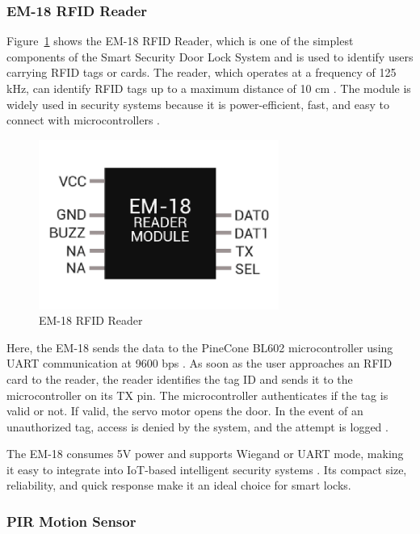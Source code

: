 \documentclass[a4paper]{scrartcl}
\begin{document}
\subsubsection{EM-18 RFID Reader}

Figure~\ref{fig:em18} shows the EM-18 RFID Reader, which is one of the simplest components of the Smart Security Door Lock System and is used to identify users carrying RFID tags or cards. The reader, which operates at a frequency of 125 kHz, can identify RFID tags up to a maximum distance of 10 cm \cite{EM18Datasheet}. The module is widely used in security systems because it is power-efficient, fast, and easy to connect with microcontrollers \cite{RFIDReaderEM18}.

\begin{figure}[H] %
    \centering
    \includegraphics[width=0.7\textwidth]{em18.pdf}
    \caption{EM-18 RFID Reader}
    \label{fig:em18}
\end{figure}

Here, the EM-18 sends the data to the PineCone BL602 microcontroller using UART communication at 9600 bps \cite{UARTWiki}. As soon as the user approaches an RFID card to the reader, the reader identifies the tag ID and sends it to the microcontroller on its TX pin. The microcontroller authenticates if the tag is valid or not. If valid, the servo motor opens the door. In the event of an unauthorized tag, access is denied by the system, and the attempt is logged \cite{RFIDInc2025}.

The EM-18 consumes 5V power and supports Wiegand or UART mode, making it easy to integrate into IoT-based intelligent security systems \cite{EM-18}. Its compact size, reliability, and quick response make it an ideal choice for smart locks.


\subsubsection{PIR Motion Sensor}
\end{document}
